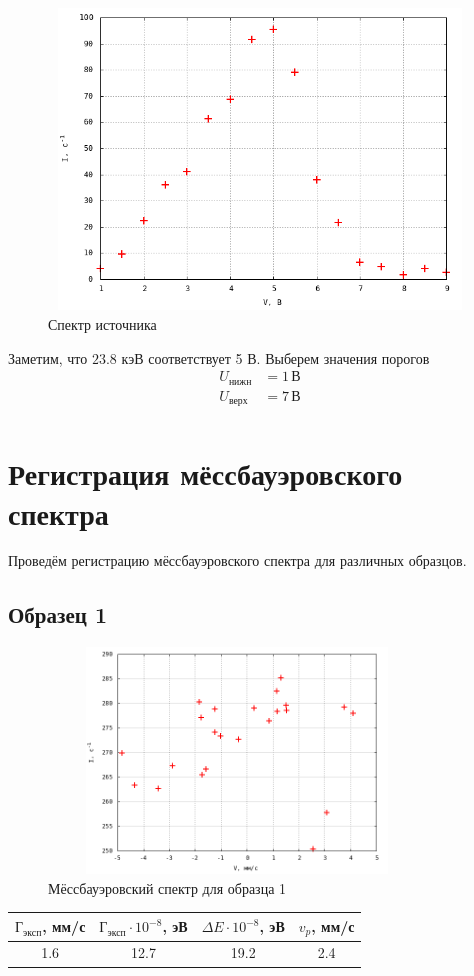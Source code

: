 \documentclass[12pt]{article}
\begin{document}
\begin{figure}[h!]
	\centering
	\includegraphics[width = 12cm, height=8cm]{plot1.png}
	\caption{Спектр источника}
\end{figure}
\par
	Заметим, что $23.8$ кэВ соответствует 5 В. Выберем значения порогов
\begin{align*}
	U_\text{нижн} &= 1 \, \text{В} \\
	U_\text{верх} &= 7 \, \text{В} \\ 
\end{align*}

\section*{Регистрация мёссбауэровского спектра}
\par
	Проведём регистрацию мёссбауэровского спектра для различных образцов.
\newpage
\subsection*{Образец 1}
	\begin{figure}[h!]
	\centering
	\includegraphics[width = 10cm, height=6cm]{plot2.png}
	\caption{Мёссбауэровский спектр для образца 1}
\end{figure}
\par
	\begin{table}[h!]
		\centering
		\begin{tabular}{|c|c|c|c|}
		\hline
			$\text{Г}_\text{эксп}$, мм/с & $\text{Г}_\text{эксп} \cdot 10^{-8}$, эВ & $\Delta E \cdot 10^{-8}$, эВ & $v_p$, мм/с \\
		\hline
			1.6 & 12.7 & 19.2 & 2.4 \\
		\hline
		\end{tabular}
	\end{table}
\end{document}
